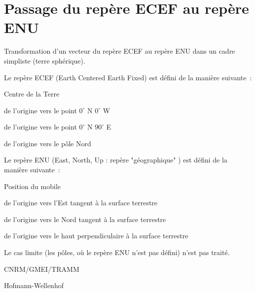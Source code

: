 %
\section{Passage du rep\`ere ECEF au rep\`ere ENU}

 

Transformation d'un vecteur du rep\`ere ECEF
au rep\`ere ENU dans un cadre simpliste (terre sph\'erique).

\bigskip







Le rep\`ere ECEF (Earth Centered Earth Fixed) est d\'efini
de la mani\`ere suivante~:
\begin{description}\itemsep0pt
 \item[~ Origine :] Centre de la Terre
 \item[~ X :] de l'origine vers le point $0^\circ$ N $0^\circ$ W
 \item[~ Y :] de l'origine vers le point $0^\circ$ N $90^\circ$ E
 \item[~ Z :] de l'origine vers le p\^ole Nord 
\end{description}

Le rep\`ere ENU (East, North, Up : rep\`ere "g\'eographique" ) est d\'efini
de la mani\`ere suivante~:
\begin{description}\itemsep0pt
 \item[~ Origine :] Position du mobile
 \item[~ X :] de l'origine vers l'Est tangent \`a la surface terrestre
 \item[~ Y :] de l'origine vers le Nord tangent \`a la surface terrestre
 \item[~ Z :] de l'origine vers le haut perpendiculaire \`a la surface terrestre
\end{description}

Le cas limite (les p\^oles, o\`u le rep\`ere ENU n'est pas d\'efini)
n'est pas trait\'e.

CNRM/GMEI/TRAMM

Hofmann-Wellenhof \cite{Hofmann-GPS}

